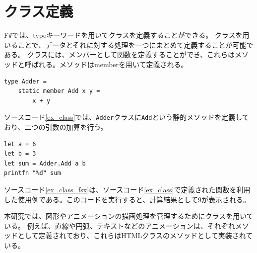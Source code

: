 \section{クラス定義}
F\texttt{\#}では、typeキーワードを用いてクラスを定義することができる。
クラスを用いることで、データとそれに対する処理を一つにまとめて定義することが可能である。
クラスには、メンバーとして関数を定義することができ、これらはメソッドと呼ばれる。メソッドはmemberを用いて定義される。
 \begin{lstlisting}[caption={F\texttt{\#}におけるクラス定義の例},label={ex_class},breaklines=true,breakatwhitespace=false]
type Adder =
    static member Add x y =
        x + y
\end{lstlisting}
ソースコード\ref{ex_class}では、\texttt{Adder}クラスに\texttt{Add}という静的メソッドを定義しており、二つの引数の加算を行う。
 \begin{lstlisting}[caption={F\texttt{\#}におけるクラス使用例},label={ex_class_fsx},breaklines=true,breakatwhitespace=false]
let a = 6
let b = 3
let sum = Adder.Add a b
printfn "%d" sum
\end{lstlisting}
ソースコード\ref{ex_class_fsx}は、ソースコード\ref{ex_class}で定義された関数を利用した使用例である。このコードを実行すると、計算結果として9が表示される。
\par
本研究では、図形やアニメーションの描画処理を管理するためにクラスを用いている。
例えば、直線や円弧、テキストなどのアニメーションは、それぞれメソッドとして定義されており、これらはHTMLクラスのメソッドとして実装されている。
